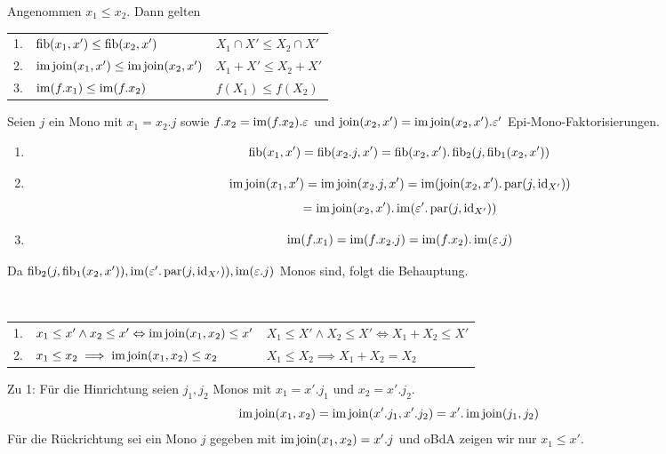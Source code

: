 \begin{lemm}[Regel (i)]
Angenommen $x_1 \leq x_2$. Dann gelten

\begin{tabular}{rll}
   1.
&  $\operatorname{fib}(x_1,x') \leq \operatorname{fib}(x_2,x')$
&  $X_1 \cap X' \leq X_2 \cap X'$
\\ 2.
&  $\operatorname{im}\operatorname{join}(x_1,x') \leq \operatorname{im}\operatorname{join}(x_2,x')$
&  $X_1 + X' \leq X_2 + X'$
\\ 3.
&  $\operatorname{im}(f.x_1) \leq \operatorname{im}(f.x_2)$
&  $f(X_1) \leq f(X_2)$
\end{tabular}
\end{lemm}
\begin{bew}
Seien $j$ ein Mono mit $x_1 = x_2.j$ sowie
$f.x_2 = \operatorname{im}(f.x_2).\varepsilon$ und
$\operatorname{join}(x_2,x') = \operatorname{im}\operatorname{join}(x_2,x').\varepsilon'$ Epi-Mono-Faktorisierungen.

\begin{enumerate}
\item
\[ \operatorname{fib}(x_1,x') = \operatorname{fib}(x_2.j,x')
= \operatorname{fib}(x_2,x').\operatorname{fib}_2(j,\operatorname{fib}_1(x_2,x'))
\]
\item
\[ \operatorname{im}\operatorname{join}(x_1,x')
= \operatorname{im}\operatorname{join}(x_2.j,x')
= \operatorname{im}(\operatorname{join}(x_2,x').\operatorname{par}(j,\operatorname{id}_{X'}))
\]\[
= \operatorname{im}\operatorname{join}(x_2,x').\operatorname{im}(\varepsilon'.\operatorname{par}(j,\operatorname{id}_{X'}))
\]
\item
\[ \operatorname{im}(f.x_1) = \operatorname{im}(f.x_2.j) = \operatorname{im}(f.x_2).\operatorname{im}(\varepsilon.j) \]
\end{enumerate}

Da $\operatorname{fib}_2(j,\operatorname{fib}_1(x_2,x')), \operatorname{im}(\varepsilon'.\operatorname{par}(j,\operatorname{id}_{X'})), \operatorname{im}(\varepsilon.j)$ Monos sind, folgt die Behauptung.

\end{bew}

\begin{lemm}[Regel (j)]
\ \linebreak

\begin{tabular}{rll}
   1.
&  $x_1 \leq x' \wedge x_2 \leq x' \Leftrightarrow \operatorname{im}\operatorname{join}(x_1,x_2)\leq x'$
&  $X_1 \leq X' \wedge X_2 \leq X' \Leftrightarrow X_1 + X_2 \leq X'$
\\ 2.
&  $x_1\leq x_2 \implies \operatorname{im}\operatorname{join}(x_1,x_2)\leq x_2$
&  $X_1 \leq X_2 \implies X_1 + X_2 = X_2$
\end{tabular}
\end{lemm}
\begin{bew}
Zu 1: Für die Hinrichtung seien $j_1,j_2$ Monos mit $x_1 = x'.j_1$ und $x_2 = x'.j_2$.
\[ \operatorname{im}\operatorname{join}(x_1,x_2) = \operatorname{im}\operatorname{join}(x'.j_1,x'.j_2) = x'.\operatorname{im}\operatorname{join}(j_1,j_2) \]
Für die Rückrichtung sei ein Mono $j$ gegeben mit $\operatorname{im}\operatorname{join}(x_1,x_2) = x'.j$ und oBdA zeigen wir nur $x_1 \leq x'$.


\end{bew}

